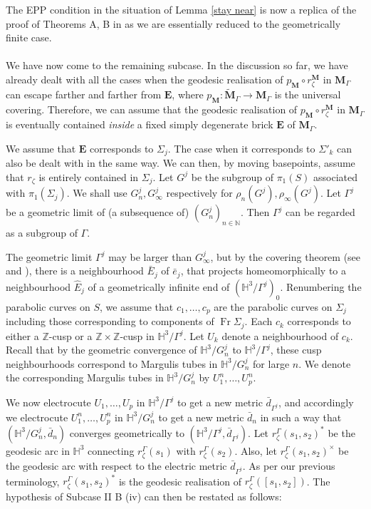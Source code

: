 \documentclass{amsart}
\theoremstyle{definition}
\newcommand{\Fr}{\operatorname{Fr}}
\newcommand{\integers}{\mathbb{Z}}
\newcommand{\naturals}{\mathbb{N}}
\newcommand{\G}{{\Gamma}}
\newcommand\HHH{{\mathbb H}}
\begin{document}
The EPP condition in the situation of Lemma \ref{stay near} is now a replica of the proof of Theorems A, B in \cite{mahan-series1} as we are essentially reduced to the geometrically finite case.\\

\\ We have now come to the remaining subcase. In the discussion so far, we have already dealt with all the cases when the geodesic realisation of  $p_{\mathbf M} \circ r^{\mathbf M}_\zeta$ in $\mathbf{M}_\G$ can escape farther and farther from $\mathbf E$, where $p_{\mathbf M} \colon \widetilde{\mathbf M}_\Gamma \to \mathbf M_\Gamma$ is the universal covering.
Therefore,  we can assume that the geodesic  realisation of $p_{\mathbf M} \circ r^{\mathbf M}_\zeta$ in $\mathbf{M}_\G$ is  eventually contained {\em inside} a fixed simply degenerate brick  $\mathbf{E}$  of $\mathbf{M}_\G$.

We assume  that  $\mathbf{E}$  corresponds to $\Sigma_j$. 
The case when it corresponds to $\Sigma'_k$ can also be dealt with in the same way.
We can then, by moving  basepoints,  assume that $r_\zeta$ is entirely contained in $\Sigma_j$.
Let $G^j$ be the subgroup of $\pi_1(S)$ associated with $\pi_1(\Sigma_j)$. We shall use $G_n^j, G_\infty^j$ respectively for $\rho_n(G^j), \rho_\infty(G^j)$.
Let $\Gamma^j$ be a geometric limit of (a subsequence of) $(G_n^j)_{n \in \naturals}$. Then  $\Gamma^j$ can be regarded as a subgroup of $\Gamma$.

The geometric limit $\Gamma^j$ may be larger than $G_\infty^j$, but by the covering theorem (see \cite{canary-cover} and \cite{OhQ}), there is a neighbourhood $\bar E_j$ of $\bar e_j$, that projects homeomorphically to a neighbourhood $\hat E_j$ of a geometrically infinite end of $(\HHH^3/\Gamma^j)_0$.
Renumbering the parabolic curves on $S$, we assume that $c_1, \dots , c_p$ are the parabolic curves on $\Sigma_j$ including those corresponding to components of $\Fr \Sigma_j$.
Each  $c_k$ corresponds to either a $\integers$-cusp or a $\integers\times \integers$-cusp in $\HHH^3/\Gamma^j$. Let $U_k$ denote a neighbourhood of $c_k$.
Recall that by the geometric convergence of $\HHH^3/G_n^j$ to $\HHH^3/\Gamma^j$, these cusp neighbourhoods correspond to Margulis tubes in $\HHH^3/G^j_n$ for large $n$.
We denote the corresponding Margulis tubes in $\HHH^3/G_n^j$ by $U^n_1, \dots , U^n_p$.

We now electrocute $U_1, \dots, U_p$ in $\HHH^3/\Gamma^j$ to get a new metric $\bar d_{\Gamma^j}$, and accordingly we electrocute $U^n_1, \dots , U^n_p$ in $\HHH^3/G_n^j$ to get a new metric $\bar d_n$ in such a way that $(\HHH^3/G_n^j, \bar d_n)$ converges geometrically to $(\HHH^3/\Gamma^j, \bar d_{\Gamma^j})$.
Let $r_\zeta^\Gamma(s_1,s_2)^*$ be the geodesic arc in $\HHH^3$ connecting $r_\zeta^\Gamma(s_1)$ with $r_\zeta^\Gamma(s_2)$. Also, let $r_\zeta^\Gamma(s_1,s_2)^\times$ be the geodesic arc with respect to the electric metric $\bar d_{\Gamma^j}$. As per our previous terminology, $r_\zeta^\Gamma(s_1,s_2)^*$ is the geodesic realisation of $r_\zeta^\Gamma([s_1,s_2])$.
The hypothesis of Subcase II B (iv) can then be restated as follows:
\end{document}
